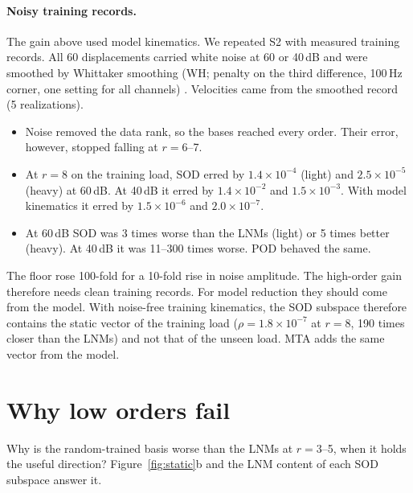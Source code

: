 \documentclass[preprint,12pt]{elsarticle}
\begin{document}
\paragraph{Noisy training records.} The gain above used model kinematics. We repeated S2 with measured training records. All 60 displacements carried white noise at 60 or 40\,dB and were smoothed by Whittaker smoothing (WH; penalty on the third difference, 100\,Hz corner, one setting for all channels) \citep{Eilers2003}. Velocities came from the smoothed record (5 realizations).
\begin{itemize}
\item Noise removed the data rank, so the bases reached every order. Their error, however, stopped falling at $r=6$--7.
\item At $r=8$ on the training load, SOD erred by $1.4\times10^{-4}$ (light) and $2.5\times10^{-5}$ (heavy) at 60\,dB. At 40\,dB it erred by $1.4\times10^{-2}$ and $1.5\times10^{-3}$. With model kinematics it erred by $1.5\times10^{-6}$ and $2.0\times10^{-7}$.
\item At 60\,dB SOD was 3 times worse than the LNMs (light) or 5 times better (heavy). At 40\,dB it was 11--300 times worse. POD behaved the same.
\end{itemize}
The floor rose 100-fold for a 10-fold rise in noise amplitude. The high-order gain therefore needs clean training records. For model reduction they should come from the model.
With noise-free training kinematics, the SOD subspace therefore contains the static vector of the training load ($\rho=1.8\times10^{-7}$ at $r=8$, 190 times closer than the LNMs) and not that of the unseen load. MTA adds the same vector from the model.



\section{Why low orders fail}\label{sec:displace}
Why is the random-trained basis worse than the LNMs at $r=3$--5, when it holds the useful direction?
Figure~\ref{fig:static}b and the LNM content of each SOD subspace answer it.
\end{document}
